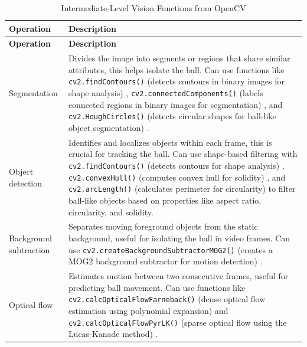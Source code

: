\documentclass[12pt,a4paper]{article}
\begin{document}
\begin{longtable}{@{}l p{}@{}}
	\caption{Intermediate-Level Vision Functions from OpenCV}
	\label{tab:intermediate} \\
	\toprule
	\textbf{Operation} & \textbf{Description} \\
	\midrule
	\endfirsthead
	\toprule
	\textbf{Operation} & \textbf{Description} \\
	\midrule
	\endhead
	Segmentation & Divides the image into segments or regions that share similar attributes, this helps isolate the ball. Can use functions like \texttt{cv2.findContours()} (detects contours in binary images for shape analysis) \parencite{opencv_contours}, \texttt{cv2.connectedComponents()} (labels connected regions in binary images for segmentation) \parencite{opencv_connected}, and \texttt{cv2.HoughCircles()} (detects circular shapes for ball-like object segmentation) \parencite{opencv_hough}. \\
	
	Object detection & Identifies and localizes objects within each frame, this is crucial for tracking the ball. Can use shape-based filtering with \texttt{cv2.findContours()} (detects contours for shape analysis) \parencite{opencv_contours}, \texttt{cv2.convexHull()} (computes convex hull for solidity) \parencite{opencv_convex}, and \texttt{cv2.arcLength()} (calculates perimeter for circularity) \parencite{opencv_arclength} to filter ball-like objects based on properties like aspect ratio, circularity, and solidity. \\
	
	Background subtraction & Separates moving foreground objects from the static background, useful for isolating the ball in video frames. Can use \texttt{cv2.createBackgroundSubtractorMOG2()} (creates a MOG2 background subtractor for motion detection) \parencite{opencv_bgsub}. \\
	
	Optical flow & Estimates motion between two consecutive frames, useful for predicting ball movement. Can use functions like \texttt{cv2.calcOpticalFlowFarneback()} (dense optical flow estimation using polynomial expansion) \parencite{opencv_farneback} and \texttt{cv2.calcOpticalFlowPyrLK()} (sparse optical flow using the Lucas-Kanade method) \parencite{opencv_pylk}. \\
	\bottomrule
\end{longtable}
	
\end{document}
